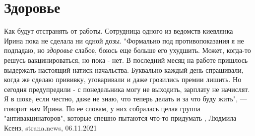  
 
 
 
 
\chapter{Здоровье}
\label{sec:slova.zdorovje}

Как будут отстранять от работы.  Сотрудница одного из ведомств киевлянка Ирина
пока не сделала ни одной дозы.  "Формально под противопоказания я не подпадаю,
но \emph{здоровье} слабое, боюсь еще больше его ухудшить. Может, когда-то
решусь вакцинироваться, но пока - нет. В последний месяц на работе пришлось
выдержать настоящий натиск начальства.  Буквально каждый день спрашивали, когда
же сделаю прививку, уговаривали и даже грозились премии лишить. Но сегодня
предупредили - с понедельника могу не выходить, зарплату не начислят. Я в шоке,
если честно, даже не знаю, что теперь делать и за что буду жить", — говорит нам
Ирина.  По ее словам, у них собралась целая группа "антивакцинаторов", которые
спешно пытаются что-то придумать
, 
Людмила Ксенз, strana.news, 06.11.2021
